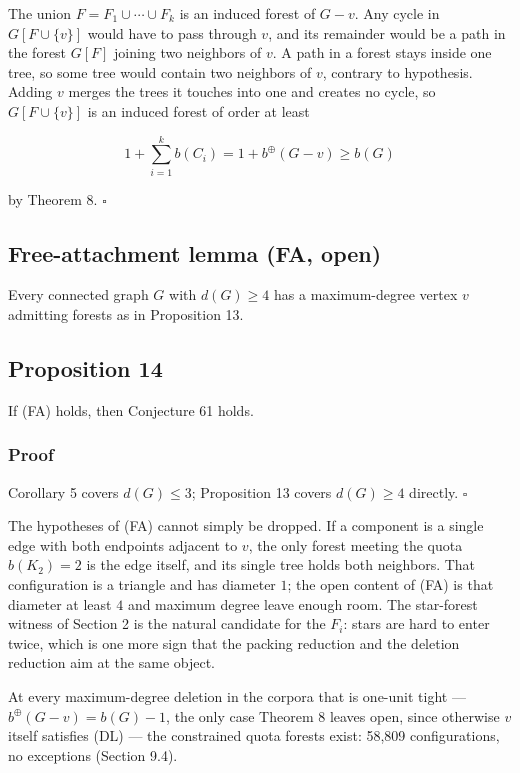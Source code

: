 \documentclass[
  11pt,
  letterpaper,
]{article}
\begin{document}
The union \(F=F_1\cup\cdots\cup F_k\) is an induced forest of \(G-v\).
Any cycle in \(G[F\cup\{v\}]\) would have to pass through \(v\), and its
remainder would be a path in the forest \(G[F]\) joining two neighbors
of \(v\). A path in a forest stays inside one tree, so some tree would
contain two neighbors of \(v\), contrary to hypothesis. Adding \(v\)
merges the trees it touches into one and creates no cycle, so
\(G[F\cup\{v\}]\) is an induced forest of order at least

\[
1+\sum_{i=1}^k b(C_i)
=1+b^\oplus(G-v)
\ge b(G)
\]

by Theorem 8. \(\square\)

\subsection{Free-attachment lemma (FA,
open)}\label{free-attachment-lemma-fa-open}

Every connected graph \(G\) with \(d(G)\ge4\) has a maximum-degree
vertex \(v\) admitting forests as in Proposition 13.

\subsection{Proposition 14}\label{proposition-14}

If (FA) holds, then Conjecture 61 holds.

\subsubsection{Proof}\label{proof-13}

Corollary 5 covers \(d(G)\le3\); Proposition 13 covers \(d(G)\ge4\)
directly. \(\square\)

The hypotheses of (FA) cannot simply be dropped. If a component is a
single edge with both endpoints adjacent to \(v\), the only forest
meeting the quota \(b(K_2)=2\) is the edge itself, and its single tree
holds both neighbors. That configuration is a triangle and has diameter
\(1\); the open content of (FA) is that diameter at least \(4\) and
maximum degree leave enough room. The star-forest witness of Section 2
is the natural candidate for the \(F_i\): stars are hard to enter twice,
which is one more sign that the packing reduction and the deletion
reduction aim at the same object.

At every maximum-degree deletion in the corpora that is one-unit tight
--- \(b^\oplus(G-v)=b(G)-1\), the only case Theorem 8 leaves open, since
otherwise \(v\) itself satisfies (DL) --- the constrained quota forests
exist: 58,809 configurations, no exceptions (Section 9.4).
\end{document}
